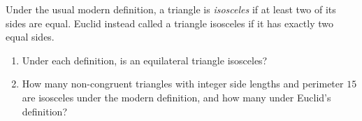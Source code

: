 Under the usual modern definition, a triangle is \emph{isosceles} if at least two of its sides are equal. Euclid instead called a triangle isosceles if it has exactly two equal sides.
\begin{enumerate}
\item[(a)] Under each definition, is an equilateral triangle isosceles?
\item[(b)] How many non-congruent triangles with integer side lengths and perimeter $15$ are isosceles under the modern definition, and how many under Euclid's definition?
\end{enumerate}
